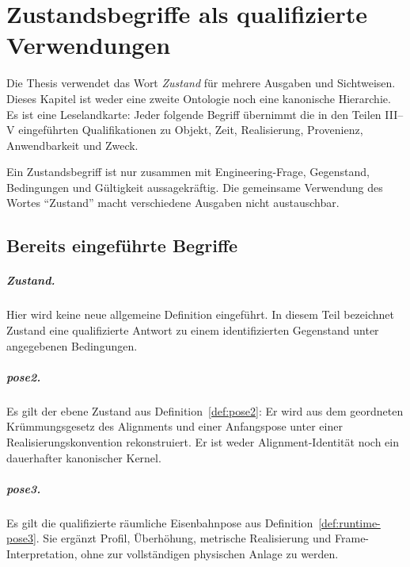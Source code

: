 
\chapter{Zustandsbegriffe als qualifizierte Verwendungen}
\label{chap:state-taxonomy}

Die Thesis verwendet das Wort \emph{Zustand} für mehrere Ausgaben und
Sichtweisen. Dieses Kapitel ist weder eine zweite Ontologie noch eine
kanonische Hierarchie. Es ist eine Leselandkarte: Jeder folgende Begriff
übernimmt die in den Teilen III--V eingeführten Qualifikationen zu Objekt,
Zeit, Realisierung, Provenienz, Anwendbarkeit und Zweck.

\begin{principle}[Zustandsschichtprinzip]
\label{princ:state-layer-principle}
Ein Zustandsbegriff ist nur zusammen mit Engineering-Frage, Gegenstand,
Bedingungen und Gültigkeit aussagekräftig. Die gemeinsame Verwendung des
Wortes ``Zustand'' macht verschiedene Ausgaben nicht austauschbar.
\end{principle}

\section{Bereits eingeführte Begriffe}

\paragraph{Zustand.}
\label{def:taxonomy-general-state}
Hier wird keine neue allgemeine Definition eingeführt. In diesem Teil
bezeichnet Zustand eine qualifizierte Antwort zu einem identifizierten
Gegenstand unter angegebenen Bedingungen.

\paragraph{pose2.}
\label{def:taxonomy-pose2}
Es gilt der ebene Zustand aus Definition~\ref{def:pose2}: Er wird aus dem geordneten
Krümmungsgesetz des Alignments und einer Anfangspose unter einer
Realisierungskonvention rekonstruiert. Er ist weder Alignment-Identität noch
ein dauerhafter kanonischer Kernel.

\paragraph{pose3.}
\label{def:taxonomy-pose3}
Es gilt die qualifizierte räumliche Eisenbahnpose aus
Definition~\ref{def:runtime-pose3}. Sie ergänzt Profil, Überhöhung, metrische
Realisierung und Frame-Interpretation, ohne zur vollständigen physischen
Anlage zu werden.


